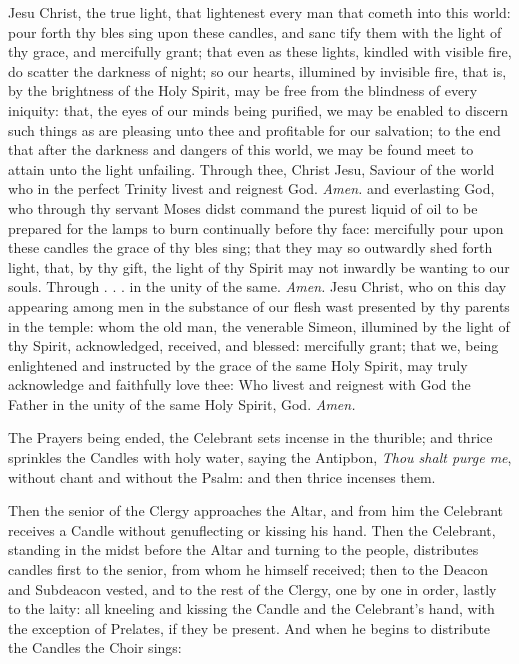 {} Jesu Christ, the true light, that lightenest every man that cometh into this world: pour forth thy bles {} sing upon these candles, and sanc {} tify them with the light of thy grace, and mercifully grant; that even as these lights, kindled with visible fire, do scatter the darkness of night; so our hearts, illumined by invisible fire, that is, by the brightness of the Holy Spirit, may be free from the blindness of every iniquity: that, the eyes of our minds being purified, we may be enabled to discern such things as are pleasing unto thee and profitable for our salvation; to the end that after the darkness and dangers of this world, we may be found meet to attain unto the light unfailing. Through thee, Christ Jesu, Saviour of the world who in the perfect Trinity livest and reignest God. \textit{Amen.}
{} and everlasting God, who through thy servant Moses didst command the purest liquid of oil to be prepared for the lamps to burn continually before thy face: mercifully pour upon these candles the grace of thy bles {} sing; that they may so outwardly shed forth light, that, by thy gift, the light of thy Spirit may not inwardly be wanting to our souls. Through . . . in the unity of the same. \textit{Amen.}
{} Jesu Christ, who on this day appearing among men in the substance of our flesh wast presented by thy parents in the temple: whom the old man, the venerable Simeon, illumined by the light of thy Spirit, acknowledged, received, and blessed: mercifully grant; that we, being enlightened and instructed by the grace of the same Holy Spirit, may truly acknowledge and faithfully love thee: Who livest and reignest with God the Father in the unity of the same Holy Spirit, God. \textit{Amen.}

\begin{rubric}
    The Prayers being ended, the Celebrant sets incense in the thurible; and thrice sprinkles the Candles with holy water, saying the Antipbon, \emph{Thou shalt purge me}, without chant and without the Psalm: and then thrice incenses them.
\end{rubric}
\begin{rubric}
    Then the senior of the Clergy approaches the Altar, and from him the Celebrant receives a Candle without genuflecting or kissing his hand. Then the Celebrant, standing in the midst before the Altar and turning to the people, distributes candles first to the senior, from whom he himself received; then to the Deacon and Subdeacon vested, and to the rest of the Clergy, one by one in order, lastly to the laity: all kneeling and kissing the Candle and the Celebrant's hand, with the exception of Prelates, if they be present. And when he begins to distribute the Candles the Choir sings:
\end{rubric}

